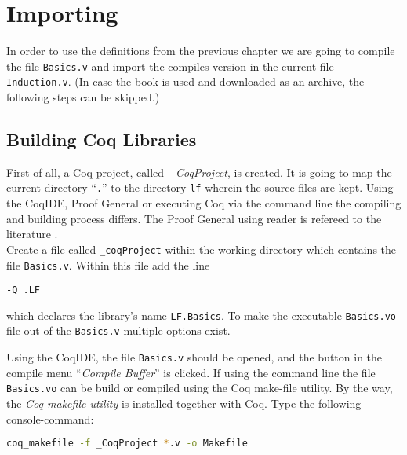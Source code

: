 \section{Importing}


In order to use the definitions from the previous chapter we are going to compile the file 
\texttt{Basics.v} and import the compiles version in the current file \texttt{Induction.v}.
(In case the book \cite{PACGGHSY} is used and downloaded as an archive, the following steps can be skipped.)   

\subsection{Building Coq Libraries}

First of all, a Coq project, called {\itshape \_CoqProject}, is created.  
It is going to map the current directory ``\texttt{.}'' to the directory \texttt{lf} wherein the source files are kept.
Using the CoqIDE, Proof General or executing Coq via the command line the compiling and building process differs.
The Proof General using reader is refereed to the literature \cite[Section, Induction, Proof by Induction]{PACGGHSY}.\\

Create a file called \texttt{\_coqProject} within the working directory which contains the file \texttt{Basics.v}.
Within this file add the line 

\begin{lstlisting}[caption = \lstinline!naming a library!]
-Q .LF
\end{lstlisting}

which declares the library's name \texttt{LF.Basics}. 
To make the executable \texttt{Basics.vo}-file out of the \texttt{Basics.v} multiple options exist.

Using the CoqIDE, the file \texttt{Basics.v} should be opened, and the button in the compile menu  ``{\itshape Compile Buffer}'' is clicked.
If using the command line the file \texttt{Basics.vo} can be build or compiled using the Coq  make-file utility.
By the way, the {\itshape Coq-makefile utility } is installed together with Coq.
Type the following console-command:
\begin{lstlisting}[language=bash, caption = \lstinline!coq-makefile!, label = lst:coq-makefile]
coq_makefile -f _CoqProject *.v -o Makefile
\end{lstlisting}

